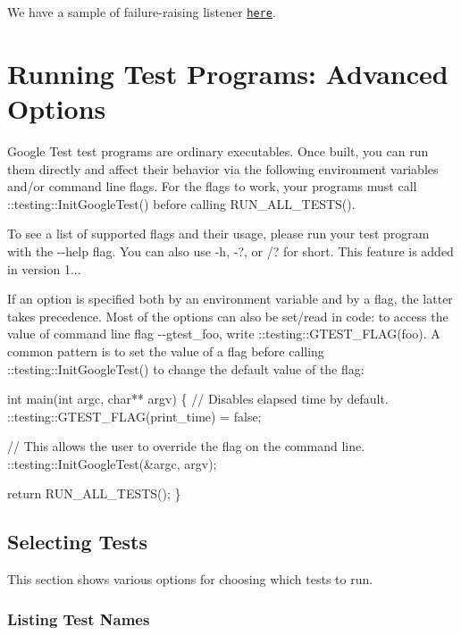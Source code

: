 We have a sample of failure-\/raising listener \href{../samples/sample10_unittest.cc}{\tt here}.

\section*{Running Test Programs\+: Advanced Options}

Google Test test programs are ordinary executables. Once built, you can run them directly and affect their behavior via the following environment variables and/or command line flags. For the flags to work, your programs must call {\ttfamily \+::testing\+::\+Init\+Google\+Test()} before calling {\ttfamily R\+U\+N\+\_\+\+A\+L\+L\+\_\+\+T\+E\+S\+T\+S()}.

To see a list of supported flags and their usage, please run your test program with the {\ttfamily -\/-\/help} flag. You can also use {\ttfamily -\/h}, {\ttfamily -\/?}, or {\ttfamily /?} for short. This feature is added in version 1...

If an option is specified both by an environment variable and by a flag, the latter takes precedence. Most of the options can also be set/read in code\+: to access the value of command line flag {\ttfamily -\/-\/gtest\+\_\+foo}, write {\ttfamily \+::testing\+::\+G\+T\+E\+S\+T\+\_\+\+F\+L\+A\+G(foo)}. A common pattern is to set the value of a flag before calling {\ttfamily \+::testing\+::\+Init\+Google\+Test()} to change the default value of the flag\+: 
\begin{DoxyCode}
int main(int argc, char** argv) \{
  // Disables elapsed time by default.
  ::testing::GTEST\_FLAG(print\_time) = false;

  // This allows the user to override the flag on the command line.
  ::testing::InitGoogleTest(&argc, argv);

  return RUN\_ALL\_TESTS();
\}
\end{DoxyCode}


\subsection*{Selecting Tests}

This section shows various options for choosing which tests to run.

\subsubsection*{Listing Test Names}

